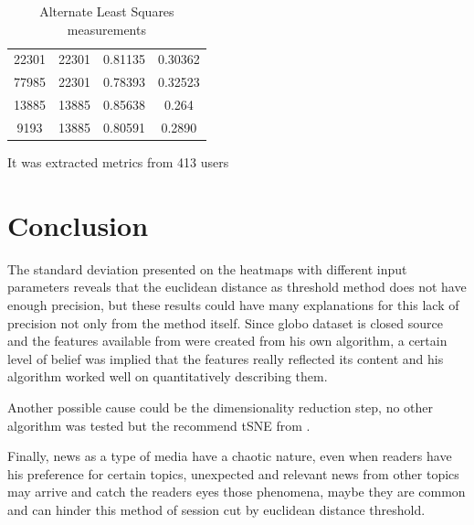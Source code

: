 \documentclass[ecp,tc,english]{iiufrgs}
\begin{document}
\begin{table}[!ht]
\begin{tabular}{ |c|c|c|c| }
                \rowcolor[RGB]{220,220,220}                
                22301 & 22301 & 0.81135 & 0.30362 \\
                \rowcolor[RGB]{220,220,220}                
                77985 & 22301 & 0.78393 & 0.32523 \\
                13885 & 13885 & 0.85638 & 0.264 \\
                9193 & 13885 & 0.80591 & 0.2890 \\
                \hline
            \end{tabular}
            \caption{Alternate Least Squares measurements}
            \label{tab:alternate_least_squares_metrics}
        \end{table}
        It was extracted metrics from 413 users


\chapter{Conclusion}
The standard deviation presented on the heatmaps with different input parameters reveals that the euclidean distance as threshold method does not have enough precision, but these results could have many explanations for this lack of precision not only from the method itself. Since globo dataset is closed source and the features available from \cite{deSouzaPereiraMoreira:2018:CDL:3240323.3240331} were created from his own algorithm, a certain level of belief was implied that the features really reflected its content and his algorithm worked well on quantitatively describing them.

Another possible cause could be the dimensionality reduction step, no other algorithm was tested but the recommend tSNE from \cite{deSouzaPereiraMoreira:2018:CDL:3240323.3240331}.

Finally, news as a type of media have a chaotic nature, even when readers have his preference for certain topics, unexpected and relevant news from other topics may arrive and catch the readers eyes those phenomena, maybe they are common and can hinder this method of session cut by euclidean distance threshold. 



\end{document}
